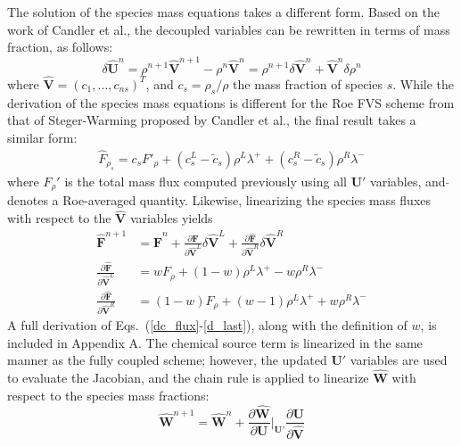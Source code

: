 The solution of the species mass equations takes a different form.  Based on the
work of Candler et al.\cite{candler}, the decoupled variables can be rewritten
in terms of mass fraction, as follows:
%
\begin{equation} \delta \mathbf{\hat{U}}^n =
  \rho^{n+1}\mathbf{\hat{V}}^{n+1}-\rho^n\mathbf{\hat{V}}^n = \rho^{n+1} \delta
  \mathbf{\hat{V}}^n + \mathbf{\hat{V}}^n \delta \rho^n \end{equation}
%
where $\mathbf{\hat{V}}=(c_1,\hdots,c_{ns})^T$, and $c_s=\rho_s/\rho$ the mass
fraction of species $s$.  While the derivation of the species mass equations is
different for the Roe FVS scheme from that of Steger-Warming proposed by Candler
et al.\cite{candler}, the final result takes a similar form: 
%
\begin{gather} \hat{F}_{\rho_s} = c_s F'_\rho+(c_s^L-\tilde{c}_s)\rho^L\lambda^+
  + (c_s^R-\tilde{c}_s)\rho^R\lambda^- \label{dc_flux} \end{gather}
%
where $F_\rho'$ is the total mass flux computed previously using all
$\mathbf{U}'$ variables, and $\tilde{}$ denotes a Roe-averaged quantity.
Likewise, linearizing the species mass fluxes with respect to the
$\mathbf{\hat{V}}$ variables yields
%
\begin{align} \mathbf{\hat{F}}^{n+1} &= \mathbf{\hat{F}}^n +\frac{\partial
    \mathbf{\hat{F}}}{\partial \mathbf{\hat{V}}^L}\delta \mathbf{\hat{V}}^L
    +\frac{\partial \mathbf{\hat{F}}}{\partial \mathbf{\hat{V}}^R}\delta
    \mathbf{\hat{V}}^R \\ \frac{\partial \mathbf{\hat{F}}}{\partial
      \mathbf{\hat{V}}^L} &= wF_\rho+(1-w)\rho^L\lambda^+ - w\rho^R\lambda^- \\
      \frac{\partial \mathbf{\hat{F}}}{\partial \mathbf{\hat{V}}^R} &=
      (1-w)F_\rho+(w-1)\rho^L\lambda^+ + w\rho^R\lambda^- \label{d_last}
    \end{align}
%
A full derivation of Eqs.~(\ref{dc_flux}-\ref{d_last}), along with the
definition of $w$, is included in Appendix A.  The chemical source term is
linearized in the same manner as the fully coupled scheme; however, the updated
$\mathbf{U}'$ variables are used to evaluate the Jacobian, and the chain rule is
applied to linearize $\mathbf{\hat{W}}$ with respect to the species mass
fractions:
%
\begin{equation} \mathbf{\hat{W}}^{n+1} = \mathbf{\hat{W}}^n+\frac{\partial
    \mathbf{\hat{W}}}{\partial \mathbf{U}}\bigg|_{\mathbf{U}'} \frac{\partial
      \mathbf{U}}{\partial \mathbf{\hat{V}}} \end{equation}

